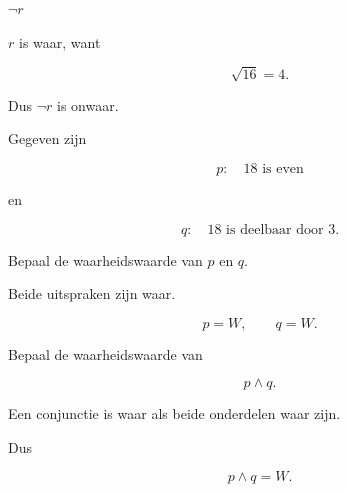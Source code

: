 \documentclass{ximera}
\begin{document}
\begin{oefening}{\oefB \ESS}
\begin{question}

$\neg r$

\begin{oplossing}

$r$ is waar, want

\[
\sqrt{16}=4.
\]

Dus $\neg r$ is onwaar.

\end{oplossing}

\end{question}

\end{oefening}





\begin{oefening}[En: de conjunctie]{\oefB \ESS}

Gegeven zijn

\[
p:\quad 18\text{ is even}
\]

en

\[
q:\quad 18\text{ is deelbaar door }3.
\]

\begin{question}

Bepaal de waarheidswaarde van $p$ en $q$.

\begin{oplossing}

Beide uitspraken zijn waar.

\[
p=W,
\qquad
q=W.
\]

\end{oplossing}

\end{question}



\begin{question}

Bepaal de waarheidswaarde van

\[
p\land q.
\]

\begin{oplossing}

Een conjunctie is waar als beide onderdelen waar zijn.

Dus

\[
p\land q=W.
\]

\end{oplossing}

\end{question}



\begin{question}


\end{question}
\end{oefening}
\end{document}
